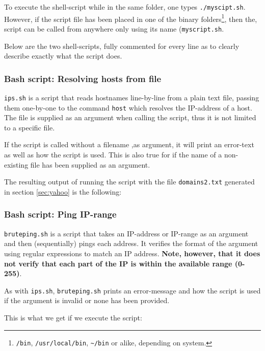 To execute the shell-script while in the same folder, one types
\texttt{./myscipt.sh}. However, if the script file has been placed in one of the
binary folders\footnote{\texttt{/bin}, \texttt{/usr/local/bin}, \texttt{\textasciitilde/bin}
  or alike, depending on system.}, then the, script can be called from anywhere only
using its name (\texttt{myscript.sh}.

Below are the two shell-scripts, fully commented for every line as to
clearly describe exactly what the script does.

\subsubsection{Bash script: Resolving hosts from file}
\texttt{ips.sh} is a script that reads hostnames line-by-line from a plain text file,
passing them one-by-one to the command \texttt{host} which resolves the IP-address of
a host. The file is supplied as an argument when calling the script, thus it is not
limited to a specific file.

If the script is called without a filename ,as argument, it will print an error-text
as well as how the script is used. This is also true for if the name of a
non-existing file has been supplied as an argument.



The resulting output of running the script with the file \texttt{domains2.txt}
generated in section \ref{sec:yahoo} is the following:



\subsubsection{Bash script: Ping IP-range}
\texttt{bruteping.sh} is a script that takes an IP-address or IP-range as an
argument and then (sequentially) pings each address. It verifies the format of the
argument using regular expressions to match an IP address. \textbf{Note, however,
that it does not verify that each part of the IP is within the available range (0-255)}.

As with \texttt{ips.sh}, \texttt{bruteping.sh} prints an error-message and how the script
is used if the argument is invalid or none has been provided.



This is what we get if we execute the script:


